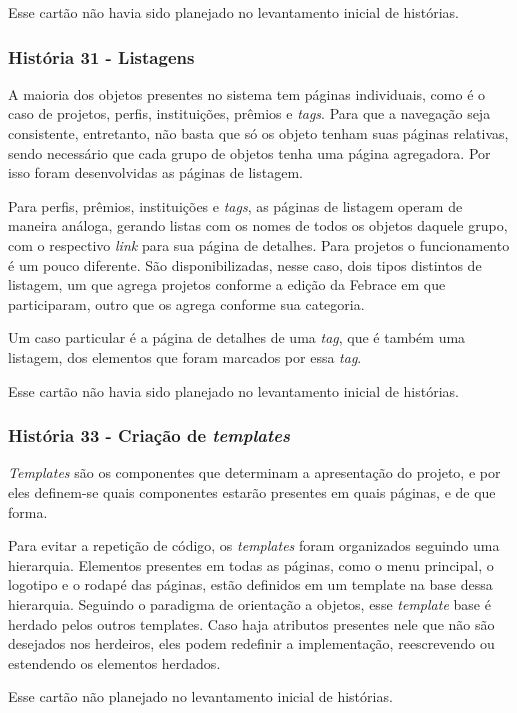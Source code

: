 \documentclass[a4paper,12pt,font=plain,header=plain]{abnt}
\begin{document}
  Esse cartão não havia sido planejado no levantamento inicial de histórias.

    \subsubsection{História 31 - Listagens}
      A maioria dos objetos presentes no sistema tem páginas individuais, como é o caso de projetos, perfis, instituições, prêmios e \textit{tags}. Para que a navegação seja consistente, entretanto, não basta que só os objeto tenham suas páginas relativas, sendo necessário que cada grupo de objetos tenha uma página agregadora. Por isso foram desenvolvidas as páginas de listagem.

      Para perfis, prêmios, instituições e \textit{tags}, as páginas de listagem operam de maneira análoga, gerando listas com os nomes de todos os objetos daquele grupo, com o respectivo \textit{link} para sua página de detalhes. Para projetos o funcionamento é um pouco diferente. São disponibilizadas, nesse caso, dois tipos distintos de listagem, um que agrega projetos conforme a edição da Febrace em que participaram, outro que os agrega conforme sua categoria.

      Um caso particular é a página de detalhes de uma \textit{tag}, que é também uma listagem, dos elementos que foram marcados por essa \textit{tag}.

  Esse cartão não havia sido planejado no levantamento inicial de histórias.

    \subsubsection{História 33 - Criação de \textit{templates}}
      \textit{Templates} são os componentes que determinam a apresentação do projeto, e por eles definem-se quais componentes estarão presentes em quais páginas, e de que forma.

      Para evitar a repetição de código, os \textit{templates} foram organizados seguindo uma hierarquia. Elementos presentes em todas as páginas, como o menu principal, o logotipo e o rodapé das páginas, estão definidos em um template na base dessa hierarquia. Seguindo o paradigma de orientação a objetos, esse \textit{template} base é herdado pelos outros templates. Caso haja atributos presentes nele que não são desejados nos herdeiros, eles podem redefinir a implementação, reescrevendo ou estendendo os elementos herdados.

  Esse cartão não planejado no levantamento inicial de histórias.
\end{document}

